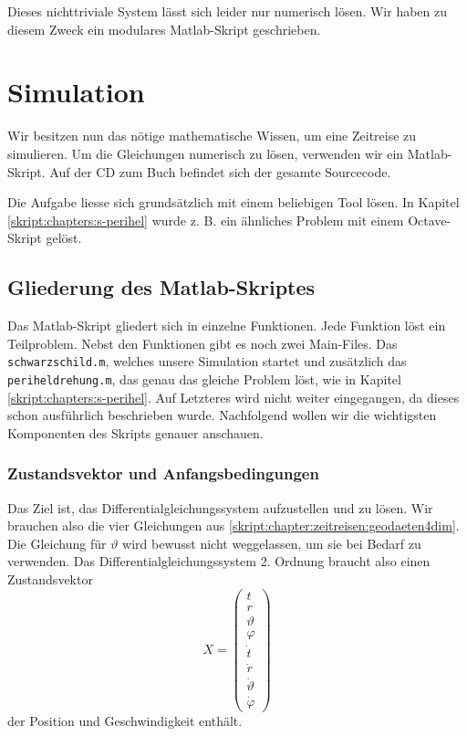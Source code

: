 \begin{refsection}
	Dieses nichttriviale System lässt sich leider nur numerisch lösen. Wir haben zu diesem Zweck ein modulares Matlab-Skript geschrieben. 
		
	\section{Simulation}\label{skript:chapter:zeitreisen:simulation}
    
    Wir besitzen nun das nötige mathematische Wissen, um eine Zeitreise zu simulieren. Um die Gleichungen numerisch zu lösen, verwenden wir ein Matlab-Skript. Auf der CD zum Buch befindet sich der gesamte Sourcecode. 
    
    Die Aufgabe liesse sich grundsätzlich mit einem beliebigen Tool lösen. In Kapitel \ref{skript:chapters:s-perihel} wurde z. B. ein ähnliches Problem mit einem Octave-Skript gelöst. 

    \subsection{Gliederung des Matlab-Skriptes}
    Das Matlab-Skript gliedert sich in einzelne Funktionen. Jede Funktion löst ein Teilproblem. Nebst den Funktionen gibt es noch zwei Main-Files. Das \texttt{schwarzschild.m}, welches unsere Simulation startet und zusätzlich das \texttt{periheldrehung.m}, das genau das gleiche Problem löst, wie in Kapitel \ref{skript:chapters:s-perihel}. Auf Letzteres wird nicht weiter eingegangen, da dieses schon ausführlich beschrieben wurde.
    Nachfolgend wollen wir die wichtigsten Komponenten des Skripts genauer anschauen.

    \subsubsection{Zustandsvektor und Anfangsbedingungen}
    Das Ziel ist, das Differentialgleichungssystem aufzustellen und zu lösen. Wir brauchen also die vier Gleichungen aus \ref{skript:chapter:zeitreisen:geodaeten4dim}. Die Gleichung für $\vartheta$ wird bewusst nicht weggelassen, um sie bei Bedarf zu verwenden. 
    Das Differentialgleichungssystem 2. Ordnung braucht also einen Zustandsvektor
    \[
    X=\begin{pmatrix}
    t\\r\\\vartheta\\\varphi \\\dot t\\\dot r\\\dot \vartheta\\\dot\varphi
    \end{pmatrix}
    \]
    der Position und Geschwindigkeit enthält.
    

\end{refsection}
